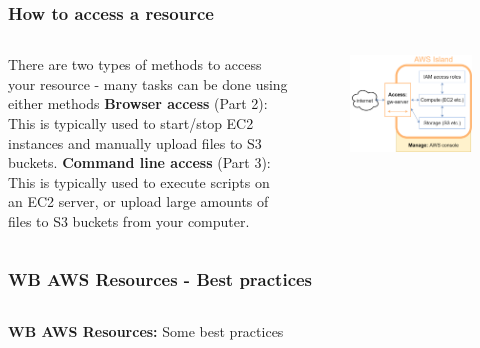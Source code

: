 \documentclass[aspectratio=169]{beamer} %
\begin{document}
\begin{frame}
	\frametitle{How to access a resource}
	
	\begin{columns}[c]
		\large There are two types of methods to access your resource - many tasks can be done using either methods
		\vspace{.3cm}\newline
		\large \textbf{Browser access} (Part 2): 
		This is typically used to start/stop EC2 instances
		 and manually upload files to S3 buckets.
		\vspace{.3cm}\newline
		\large \textbf{Command line access} (Part 3): 
		This is typically used to execute scripts on an EC2 server,
		or upload large amounts of files 
		to S3 buckets from your computer.
		
		\begin{figure}
			\centering
			\includegraphics[width=\textwidth]{./img/wb-aws.png}
		\end{figure}
		
	\end{columns}
\end{frame}

\begin{frame}
	\frametitle{WB AWS Resources - Best practices}
	\begin{columns}[c]
		
		
		\textbf{WB AWS Resources:} Some best practices
		
	\end{columns}
\end{frame}
\end{document}
